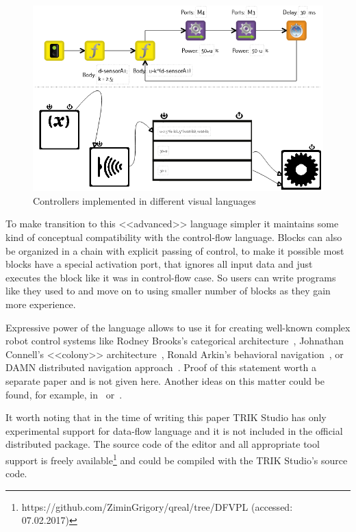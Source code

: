 \documentclass[conference]{IEEEtran}
\begin{document}
\begin{figure}[ht]
    \centering
    \includegraphics[width=\columnwidth]{TS_AlongTheBox_Comparison.png}
    \caption{Controllers implemented in different visual languages}
    \label{image:alongTheBox_CF_DF}
\end{figure}

To make transition to this <<advanced>> language simpler it maintains some kind of conceptual compatibility with the control-flow language. Blocks can also be organized in a chain with explicit passing of control, to make it possible most blocks have a special activation port, that ignores all input data and just executes the block like it was in control-flow case. So users can write programs like they used to and move on to using smaller number of blocks as they gain more experience.

Expressive power of the language allows to use it for creating well-known complex robot control systems like Rodney Brooks's categorical architecture~\cite{brooks1986robust}, Johnathan Connell's <<colony>> architecture~\cite{connell1989colony}, Ronald Arkin's behavioral navigation~\cite{arkin1987motor}, or DAMN distributed navigation approach~\cite{rosenblatt1997damn}. Proof of this statement worth a separate paper and is not given here. Another ideas on this matter could be found, for example, in~\cite{simpson2009toward} or~\cite{banyasad2000visual}.

It worth noting that in the time of writing this paper TRIK Studio has only experimental support for data-flow language and it is not included in the official distributed package. The source code of the editor and all appropriate tool support is freely available\footnote{https://github.com/ZiminGrigory/qreal/tree/DFVPL (accessed: 07.02.2017)} and could be compiled with the TRIK Studio's source code.
\end{document}

